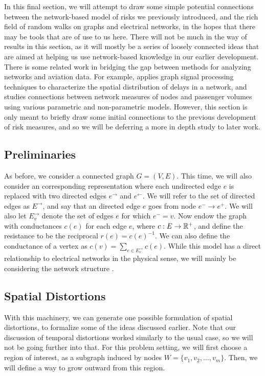 In this final section, we will attempt to draw some simple potential connections between the network-based model of risks we previously introduced, and the rich field of random walks on graphs and electrical networks, in the hopes that there may be tools that are of use to us here. There will not be much in the way of results in this section, as it will mostly be a series of loosely connected ideas that are aimed at helping us use network-based knowledge in our earlier development. There is some related work in bridging the gap between methods for analyzing networks and aviation data. For example, \cite{Li_Gopalakrishnan_Pantoja_Balakrishnan_2021} applies graph signal processing techniques to characterize the spatial distribution of delays in a network, and \cite{Huynh_Ng_Toh_Feng_2024} studies connections between network measures of nodes and passenger volumes using various parametric and non-parametric models. However, this section is only meant to briefly draw some initial connections to the previous development of risk measures, and so we will be deferring a more in depth study to later work.

\subsection{Preliminaries}

As before, we consider a connected graph $G=(V,E)$. This time, we will also consider an corresponding representation where each undirected edge $e$ is replaced with two directed edges $e^\rightarrow$ and $e^\leftarrow$. We will refer to the set of directed edges as $E^\rightarrow$, and say that an directed edge $e$ goes from node $e^-\to e^+$. We will also let $E^\rightarrow_v$ denote the set of edges $e$ for which $e^-=v$. Now endow the graph with conductances $c(e)$ for each edge $e$, where $c:E\to\mathbb R^+$, and define the resistance to be the reciprocal $r(e) = c(e)^{-1}$. We can also define the conductance of a vertex as $c(v) = \sum_{e\in E^\rightarrow_v} c(e)$. While this model has a direct relationship to electrical networks in the physical sense, we will mainly be considering the network structure \cite{lyons2017probability}.

\subsection{Spatial Distortions}

With this machinery, we can generate one possible formulation of spatial distortions, to formalize some of the ideas discussed earlier. Note that our discussion of temporal distortions worked similarly to the usual case, so we will not be going further into that. For this problem setting, we will first choose a region of interest, as a subgraph induced by nodes $W=\{v_1,v_2,\ldots,v_m\}$. Then, we will define a way to grow outward from this region. 

